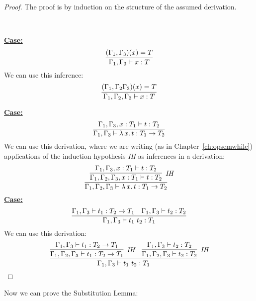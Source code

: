 \documentclass{article}
\begin{document}
\begin{proof}
The proof is by induction on the structure of the assumed derivation.

\

\noindent\underline{\textbf{Case:}}
\[
\infer{\Gamma_1,\Gamma_3\vdash x : T}{(\Gamma_1,\Gamma_3)(x) = T}
\]
\noindent We can use this inference:
\[
\infer{\Gamma_1,\Gamma_2,\Gamma_3\vdash x : T}{(\Gamma_1,\Gamma_2\Gamma_3)(x) = T}
\]

\noindent\underline{\textbf{Case:}}
\[
\infer{\Gamma_1,\Gamma_3\vdash \lambda\,x.\,t : T_1 \to T_2}
      {\Gamma_1,\Gamma_3,x:T_1\vdash t:T_2}
\]
\noindent We can use this derivation, where we are writing (as in Chapter~\ref{ch:opsemwhile})
applications of the induction hypothesis \textit{IH} as inferences in a derivation:
\[
\infer{\Gamma_1,\Gamma_2,\Gamma_3\vdash \lambda\,x.\,t : T_1 \to T_2}
      {\infer[\textit{IH}]{\Gamma_1,\Gamma_2,\Gamma_3,x:T_1\vdash t:T_2}{\Gamma_1,\Gamma_3,x:T_1\vdash t:T_2}}
\]
\noindent\underline{\textbf{Case:}}
\[
\infer{\Gamma_1,\Gamma_3\vdash t_1\ t_2 : T_1}
      {\Gamma_1,\Gamma_3\vdash t_1 : T_2 \to T_1 &
       \Gamma_1,\Gamma_3\vdash t_2 : T_2}
\]
\noindent We can use this derivation:
\[
\infer{\Gamma_1,\Gamma_3\vdash t_1\ t_2 : T_1}
      {\infer[\textit{IH}]{\Gamma_1,\Gamma_2,\Gamma_3\vdash t_1 : T_2 \to T_1}{\Gamma_1,\Gamma_3\vdash t_1 : T_2 \to T_1} &
       \infer[\textit{IH}]{\Gamma_1,\Gamma_2,\Gamma_3\vdash t_2 : T_2}{\Gamma_1,\Gamma_3\vdash t_2 : T_2}}
\]
\end{proof}

\noindent Now we can prove the Substitution Lemma:
\end{document}
